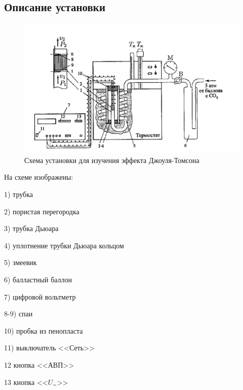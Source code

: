 \documentclass[a4paper,12pt]{article} %
\begin{document}
\subsection{Описание установки}
 
 \begin{figure}[h]

\centering

\includegraphics[width=0.8\linewidth]{lab 2.1.6.png}

\caption{Схема установки для изучения эффекта Джоуля-Томсона}

\label{fig:mpr}

\end{figure}


На схеме изображены:\\[0.1 cm]


\begin{minipage}{0.4\textwidth}
  
  1) трубка
  
  2) пористая перегородка
  
  3) трубка Дьюара
  
  4) уплотнение трубки Дьюара кольцом
  
  5) змеевик
  
  6) балластный баллон
\end{minipage}
\hfill
\begin{minipage}{0.4\textwidth}
  
  
  7) цифровой вольтметр
  
  8-9) спаи
  
  10) пробка из пенопласта
  
  11) выключатель <<Сеть>>
  
  12 кнопка <<АВП>>
  
  13 кнопка <<$U_=$>>
  
  
\end{minipage}\\[0.3 cm]
\end{document}
